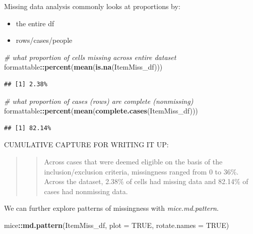 \documentclass[
  11pt,
]{book}
\newenvironment{Shaded}{\begin{snugshade}}{\end{snugshade}}
\newcommand{\AttributeTok}[1]{\textcolor[rgb]{0.27,0.27,0.27}{#1}}
\newcommand{\CommentTok}[1]{\textcolor[rgb]{0.37,0.37,0.37}{\textit{#1}}}
\newcommand{\ConstantTok}[1]{\textcolor[rgb]{0.37,0.37,0.37}{#1}}
\newcommand{\FunctionTok}[1]{\textcolor[rgb]{0.27,0.27,0.27}{\textbf{#1}}}
\newcommand{\NormalTok}[1]{#1}
\newcommand{\SpecialCharTok}[1]{\textcolor[rgb]{0.43,0.43,0.43}{\textbf{#1}}}
\providecommand{\tightlist}{%
  \setlength{\itemsep}{0pt}\setlength{\parskip}{0pt}}
\begin{document}
Missing data analysis commonly looks at proportions by:

\begin{itemize}
\tightlist
\item
  the entire df
\item
  rows/cases/people
\end{itemize}

\begin{Shaded}
\begin{Highlighting}[]
\CommentTok{\# what proportion of cells missing across entire dataset}
\NormalTok{formattable}\SpecialCharTok{::}\FunctionTok{percent}\NormalTok{(}\FunctionTok{mean}\NormalTok{(}\FunctionTok{is.na}\NormalTok{(ItemMiss\_df)))}
\end{Highlighting}
\end{Shaded}

\begin{verbatim}
## [1] 2.38%
\end{verbatim}

\begin{Shaded}
\begin{Highlighting}[]
\CommentTok{\# what proportion of cases (rows) are complete (nonmissing)}
\NormalTok{formattable}\SpecialCharTok{::}\FunctionTok{percent}\NormalTok{(}\FunctionTok{mean}\NormalTok{(}\FunctionTok{complete.cases}\NormalTok{(ItemMiss\_df)))}
\end{Highlighting}
\end{Shaded}

\begin{verbatim}
## [1] 82.14%
\end{verbatim}

CUMULATIVE CAPTURE FOR WRITING IT UP:

\begin{quote}
\begin{quote}
Across cases that were deemed eligible on the basis of the inclusion/exclusion criteria, missingness ranged from 0 to 36\%. Across the dataset, 2.38\% of cells had missing data and 82.14\% of cases had nonmissing data.
\end{quote}
\end{quote}

We can further explore patterns of missingness with \emph{mice.md.pattern}.

\begin{Shaded}
\begin{Highlighting}[]
\NormalTok{mice}\SpecialCharTok{::}\FunctionTok{md.pattern}\NormalTok{(ItemMiss\_df, }\AttributeTok{plot =} \ConstantTok{TRUE}\NormalTok{, }\AttributeTok{rotate.names =} \ConstantTok{TRUE}\NormalTok{)}
\end{Highlighting}
\end{Shaded}
\end{document}
